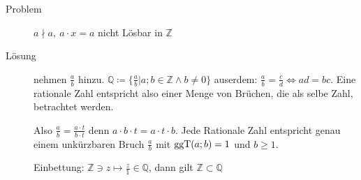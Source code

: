 \begin{description}
    \item[Problem] $a \nmid a,\ a \cdot x = a$ nicht Lösbar in $\mathbb{Z}$
    \item[Lösung] nehmen $\frac{a}{b}$ hinzu. $\mathbb{Q} \coloneqq \lbrace \frac{a}{b} | a;b \in \mathbb{Z} \wedge b \not = 0 \rbrace$ auserdem: $\frac{a}{b} = \frac{c}{d} \Leftrightarrow ad = bc$.
    Eine rationale Zahl entspricht also einer Menge von Brüchen, die als selbe Zahl, betrachtet werden.

    Also $\frac{a}{b} = \frac{a \cdot t}{b \cdot t}$ denn $a \cdot b \cdot t = a \cdot t \cdot b$.
    Jede Rationale Zahl entspricht genau einem unkürzbaren Bruch $\frac{a}{b}$ mit $\operatorname{ggT}(a;b) = 1$ und $b \geq 1$.

    Einbettung: $\mathbb{Z}\ni z \longmapsto \frac{z}{1} \in \mathbb{Q}$, dann gilt $\mathbb{Z} \subset \mathbb{Q}$


\end{description}

